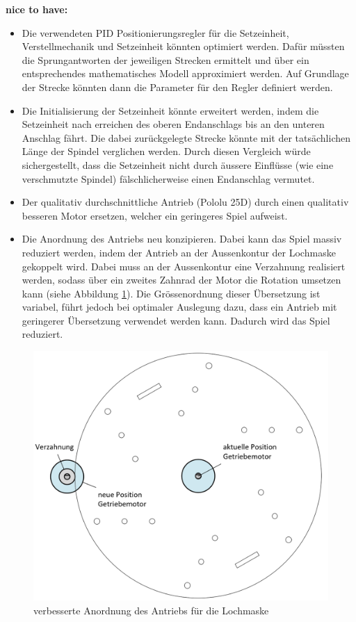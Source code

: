 \textbf{nice to have:}
\begin{itemize}
	\item Die verwendeten PID Positionierungsregler für die Setzeinheit, Verstellmechanik und Setzeinheit könnten optimiert werden. Dafür müssten die Sprungantworten der jeweiligen Strecken ermittelt und über ein entsprechendes mathematisches Modell approximiert werden. Auf Grundlage der Strecke könnten dann die Parameter für den Regler definiert werden.
	\item Die Initialisierung der Setzeinheit könnte erweitert werden, indem die Setzeinheit nach erreichen des oberen Endanschlags bis an den unteren Anschlag fährt. Die dabei zurückgelegte Strecke könnte mit der tatsächlichen Länge der Spindel verglichen werden. Durch diesen Vergleich würde sichergestellt, dass die Setzeinheit nicht durch äussere Einflüsse (wie eine verschmutzte Spindel) fälschlicherweise einen Endanschlag vermutet.
	\item Der qualitativ durchschnittliche Antrieb (Pololu 25D) durch einen qualitativ besseren Motor ersetzen, welcher ein geringeres Spiel aufweist.
	\item Die Anordnung des Antriebs neu konzipieren. Dabei kann das Spiel massiv reduziert werden, indem der Antrieb an der Aussenkontur der Lochmaske gekoppelt wird. Dabei muss an der Aussenkontur eine Verzahnung realisiert werden, sodass über ein zweites Zahnrad der Motor die Rotation umsetzen kann (siehe Abbildung \ref{fig:optimierung_lochmaske}). Die Grössenordnung dieser Übersetzung ist variabel, führt jedoch bei optimaler Auslegung dazu, dass ein Antrieb mit geringerer Übersetzung verwendet werden kann. Dadurch wird das Spiel reduziert. 
\end{itemize}

\begin{figure}[H]
	\includegraphics[draft=false,scale=0.3]{Illustrationen/8-Fazit/optimierung_lochmaske.png}
	\caption{verbesserte Anordnung des Antriebs für die Lochmaske}
	\label{fig:optimierung_lochmaske}
\end{figure}